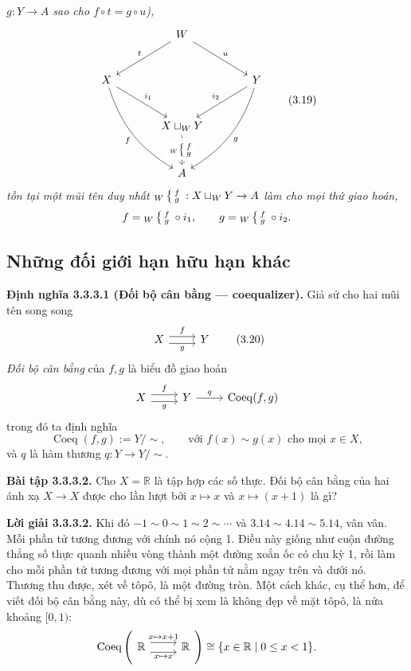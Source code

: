 \emph{$g:Y\to A$ sao cho $f\circ t=g\circ u$),}
\begin{equation*}\begin{tikzcd}[column sep=large,row sep=large]
&W\arrow[dl,"t"']\arrow[dr,"u"]&\\
X\arrow[dr,"i_1"]\arrow[ddr,bend right=20,"f"']&&Y\arrow[dl,"i_2"']\arrow[ddl,bend left=20,"g"]\\
&X\sqcup_WY\arrow[d,dashed,"{_W\ctIIIcase{f}{g}}" description]&\\&A&
\end{tikzcd}\tag{3.19}\end{equation*}
\emph{tồn tại một mũi tên duy nhất ${}_W\left\{\begin{smallmatrix}f\\g\end{smallmatrix}\right.:X\sqcup_WY\to A$ làm cho mọi thứ giao hoán,}
\[f={}_W\left\{\begin{smallmatrix}f\\g\end{smallmatrix}\right.\circ i_1,\qquad g={}_W\left\{\begin{smallmatrix}f\\g\end{smallmatrix}\right.\circ i_2.\]

\subsection{Những đối giới hạn hữu hạn khác}
\noindent\textbf{Định nghĩa 3.3.3.1 (Đối bộ cân bằng --- coequalizer).} Giả sử cho hai mũi tên song song
\begin{equation*}\begin{tikzcd}X\arrow[r,shift left=.7ex,"f"]\arrow[r,shift right=.7ex,"g"']&Y\end{tikzcd}\tag{3.20}\end{equation*}
\emph{Đối bộ cân bằng} của $f,g$ là biểu đồ giao hoán
\[\begin{tikzcd}X\arrow[r,shift left=.7ex,"f"]\arrow[r,shift right=.7ex,"g"']&Y\arrow[r,"q"]&\operatorname{Coeq}(f,g)\end{tikzcd}\]
trong đó ta định nghĩa
\[\operatorname{Coeq}(f,g):=Y/{\sim},\qquad\text{với }f(x)\sim g(x)\text{ cho mọi }x\in X,\]
và $q$ là hàm thương $q:Y\to Y/{\sim}$.

\noindent\textbf{Bài tập 3.3.3.2.} Cho $X=\mathbb R$ là tập hợp các số thực. Đối bộ cân bằng của hai ánh xạ $X\to X$ được cho lần lượt bởi $x\mapsto x$ và $x\mapsto(x+1)$ là gì?

\noindent\textbf{Lời giải 3.3.3.2.} Khi đó $-1\sim0\sim1\sim2\sim\cdots$ và $3.14\sim4.14\sim5.14$, vân vân. Mỗi phần tử tương đương với chính nó cộng 1. Điều này giống như cuộn đường thẳng số thực quanh nhiều vòng thành một đường xoắn ốc có chu kỳ 1, rồi làm cho mỗi phần tử tương đương với mọi phần tử nằm ngay trên và dưới nó. Thương thu được, xét về tôpô, là một đường tròn. Một cách khác, cụ thể hơn, để viết đối bộ cân bằng này, dù có thể bị xem là không đẹp về mặt tôpô, là nửa khoảng $[0,1)$:
\[\operatorname{Coeq}\left(\begin{tikzcd}\mathbb R\arrow[r,shift left=1ex,"{x\mapsto x+1}"]\arrow[r,shift right=1ex,"{x\mapsto x}"']&\mathbb R\end{tikzcd}\right)\cong\{x\in\mathbb R\mid0\le x<1\}.\]

